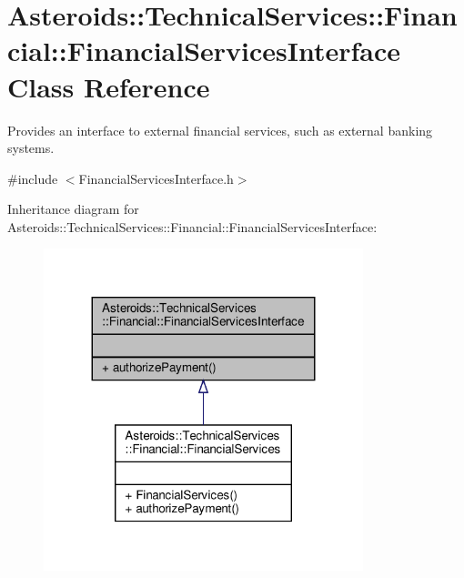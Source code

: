 \hypertarget{classAsteroids_1_1TechnicalServices_1_1Financial_1_1FinancialServicesInterface}{}\section{Asteroids\+:\+:Technical\+Services\+:\+:Financial\+:\+:Financial\+Services\+Interface Class Reference}
\label{classAsteroids_1_1TechnicalServices_1_1Financial_1_1FinancialServicesInterface}


Provides an interface to external financial services, such as external banking systems.  




{\ttfamily \#include $<$Financial\+Services\+Interface.\+h$>$}



Inheritance diagram for Asteroids\+:\+:Technical\+Services\+:\+:Financial\+:\+:Financial\+Services\+Interface\+:\nopagebreak
\begin{figure}[H]
\begin{center}
\leavevmode
\includegraphics[width=263pt]{classAsteroids_1_1TechnicalServices_1_1Financial_1_1FinancialServicesInterface__inherit__graph}
\end{center}
\end{figure}


